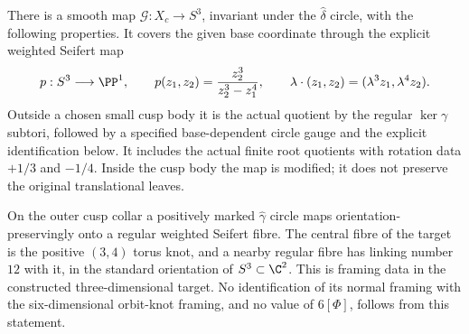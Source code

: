 \begin{proposition}
There is a smooth map $\mathcal G:X_c\to S^3$, invariant under
the $\widehat\delta$ circle, with the following properties.
It covers the given base coordinate through the explicit weighted
Seifert map
\[
 p:S^3\longrightarrow\PP^1,\qquad
 p(z_1,z_2)=\frac{z_2^3}{z_2^3-z_1^4},\qquad
 \lambda\cdot(z_1,z_2)=(\lambda^3z_1,\lambda^4z_2).
\]
Outside a chosen small cusp body it is the actual quotient by
the regular $\ker\gamma$ subtori, followed by a specified
base-dependent circle gauge and the explicit identification below.
It includes the actual finite root quotients with rotation data
$+1/3$ and $-1/4$. Inside the cusp body the map is modified;
it does not preserve the original translational leaves.

On the outer cusp collar a positively marked $\widehat\gamma$
circle maps orientation-preservingly onto a regular weighted
Seifert fibre. The central fibre of the target is the positive
$(3,4)$ torus knot, and a nearby regular fibre has linking number
$12$ with it, in the standard orientation of $S^3\subset\C^2$.
This is framing data in the constructed three-dimensional target.
No identification of its normal framing with the six-dimensional
orbit-knot framing, and no value of $6[\Phi]$, follows from this
statement.
\end{proposition}
